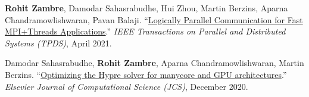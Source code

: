 \documentclass[11pt,article,oneside]{memoir}
\renewcommand*{\labelenumi}{[\labelprefix\theenumi]}
\begin{document}
\begin{etaremune}

\item \textbf{Rohit Zambre}, Damodar Sahasrabudhe, Hui Zhou, Martin Berzins, Aparna Chandramowlishwaran, Pavan Balaji. ``\href{https://doi.org/10.1109/TPDS.2021.3075157}{Logically Parallel Communication for Fast MPI+Threads Applications}.'' \emph{IEEE Transactions on Parallel and Distributed Systems (TPDS)}, April 2021.

\item Damodar Sahasrabudhe, \textbf{Rohit Zambre}, Aparna Chandramowlishwaran, Martin Berzins. ``\href{https://doi.org/10.1016/j.jocs.2020.101279}{Optimizing the Hypre solver for manycore and GPU architectures}.'' \emph{Elsevier Journal of Computational Science (JCS)}, December 2020.

\end{etaremune}


 

\bigskip


\def\labelprefix{C}
\end{document}
